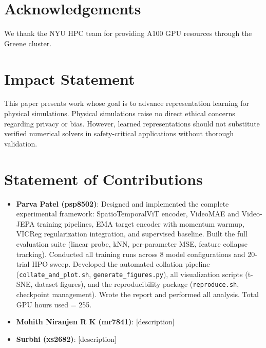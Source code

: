 \documentclass{article}
\begin{document}
\section*{Acknowledgements}

We thank the NYU HPC team for providing A100 GPU resources through the Greene cluster.

\section*{Impact Statement}

This paper presents work whose goal is to advance representation learning for physical simulations. Physical simulations raise no direct ethical concerns regarding privacy or bias. However, learned representations should not substitute verified numerical solvers in safety-critical applications without thorough validation.

\section*{Statement of Contributions}
\begin{itemize}
    \item \textbf{Parva Patel (psp8502)}: Designed and implemented the complete experimental framework: SpatioTemporalViT encoder, VideoMAE and Video-JEPA training pipelines, EMA target encoder with momentum warmup, VICReg regularization integration, and supervised baseline. Built the full evaluation suite (linear probe, kNN, per-parameter MSE, feature collapse tracking). Conducted all training runs across 8 model configurations and 20-trial HPO sweep. Developed the automated collation pipeline (\texttt{collate\_and\_plot.sh}, \texttt{generate\_figures.py}), all visualization scripts (t-SNE, dataset figures), and the reproducibility package (\texttt{reproduce.sh}, checkpoint management). Wrote the report and performed all analysis. Total GPU hours used = 255.
    \item \textbf{Mohith Niranjen R K (mr7841)}: [description]
    \item \textbf{Surbhi (xs2682)}: [description]
\end{itemize}
\end{document}
